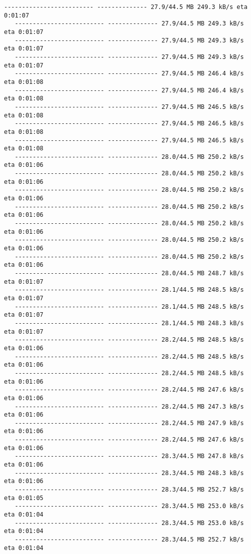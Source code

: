 \documentclass[11pt]{article}
\begin{document}
\begin{Verbatim}[commandchars=\\\{\}]
   ------------------------- -------------- 27.9/44.5 MB 249.3 kB/s eta 0:01:07
   ------------------------- -------------- 27.9/44.5 MB 249.3 kB/s eta 0:01:07
   ------------------------- -------------- 27.9/44.5 MB 249.3 kB/s eta 0:01:07
   ------------------------- -------------- 27.9/44.5 MB 249.3 kB/s eta 0:01:07
   ------------------------- -------------- 27.9/44.5 MB 246.4 kB/s eta 0:01:08
   ------------------------- -------------- 27.9/44.5 MB 246.4 kB/s eta 0:01:08
   ------------------------- -------------- 27.9/44.5 MB 246.5 kB/s eta 0:01:08
   ------------------------- -------------- 27.9/44.5 MB 246.5 kB/s eta 0:01:08
   ------------------------- -------------- 27.9/44.5 MB 246.5 kB/s eta 0:01:08
   ------------------------- -------------- 28.0/44.5 MB 250.2 kB/s eta 0:01:06
   ------------------------- -------------- 28.0/44.5 MB 250.2 kB/s eta 0:01:06
   ------------------------- -------------- 28.0/44.5 MB 250.2 kB/s eta 0:01:06
   ------------------------- -------------- 28.0/44.5 MB 250.2 kB/s eta 0:01:06
   ------------------------- -------------- 28.0/44.5 MB 250.2 kB/s eta 0:01:06
   ------------------------- -------------- 28.0/44.5 MB 250.2 kB/s eta 0:01:06
   ------------------------- -------------- 28.0/44.5 MB 250.2 kB/s eta 0:01:06
   ------------------------- -------------- 28.0/44.5 MB 248.7 kB/s eta 0:01:07
   ------------------------- -------------- 28.1/44.5 MB 248.5 kB/s eta 0:01:07
   ------------------------- -------------- 28.1/44.5 MB 248.5 kB/s eta 0:01:07
   ------------------------- -------------- 28.1/44.5 MB 248.3 kB/s eta 0:01:07
   ------------------------- -------------- 28.2/44.5 MB 248.5 kB/s eta 0:01:06
   ------------------------- -------------- 28.2/44.5 MB 248.5 kB/s eta 0:01:06
   ------------------------- -------------- 28.2/44.5 MB 248.5 kB/s eta 0:01:06
   ------------------------- -------------- 28.2/44.5 MB 247.6 kB/s eta 0:01:06
   ------------------------- -------------- 28.2/44.5 MB 247.3 kB/s eta 0:01:06
   ------------------------- -------------- 28.2/44.5 MB 247.9 kB/s eta 0:01:06
   ------------------------- -------------- 28.2/44.5 MB 247.6 kB/s eta 0:01:06
   ------------------------- -------------- 28.3/44.5 MB 247.8 kB/s eta 0:01:06
   ------------------------- -------------- 28.3/44.5 MB 248.3 kB/s eta 0:01:06
   ------------------------- -------------- 28.3/44.5 MB 252.7 kB/s eta 0:01:05
   ------------------------- -------------- 28.3/44.5 MB 253.0 kB/s eta 0:01:04
   ------------------------- -------------- 28.3/44.5 MB 253.0 kB/s eta 0:01:04
   ------------------------- -------------- 28.3/44.5 MB 252.7 kB/s eta 0:01:04

\end{Verbatim}
\end{document}
